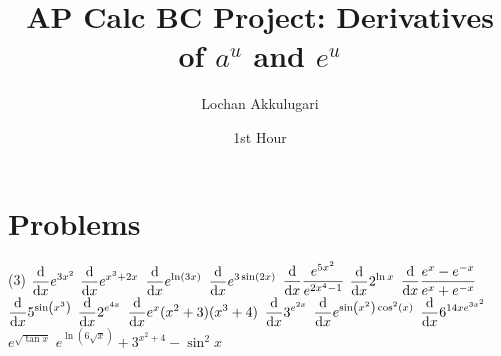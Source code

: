 \documentclass{article}
\title{AP Calc BC Project: Derivatives of \(a^u\) and \(e^u\)}
\author{Lochan Akkulugari}
\date{1st Hour}
\newcommand{\indisp}[1]{\(\displaystyle #1\)}
\begin{document}
	\maketitle
	\section*{Problems}
		\begin{tasks}[style = enumerate](3)
			\task
				\indisp{\dv{x} e^{3x^2}}
			\task
				\indisp{\dv{x} e^{x^3 + 2x}}
			\task
				\indisp{\dv{x} e^{\ln(3x)}}
			\task
				\indisp{\dv{x} e^{3\sin(2x)}}
			\task
				\indisp{\dv{x} \frac{e^{5x^2}}{e^{2x^4 - 1}}}
			\task
				\indisp{\dv{x} 2^{\ln x} }
			\task
				\indisp{\dv{x} \frac{e^x - e^{-x}}{e^x + e^{-x}}}
			\task
				\indisp{\dv{x} 5^{\sin(x^3)}}
			\task
				\indisp{\dv{x} 2^{e^{4x}}}
			\task
				\indisp{\dv{x} e^x(x^2 + 3)(x^3 + 4)}
			\task
				\indisp{\dv{x} 3^{e^{2x}}}
			\task
				\indisp{\dv{x} e^{\sin(x^2)\cos^2(x)}}
			\task
				\indisp{\dv{x} 6^{14x{e^{3x^2}}}}
			\task
				\indisp{e^{\sqrt{{\tan x}}}}
			\task
				\indisp{e^{\ln(6\sqrt{x})} + 3^{x^2+4} - \sin^2x}
		\end{tasks}
	\newpage
\end{document}
